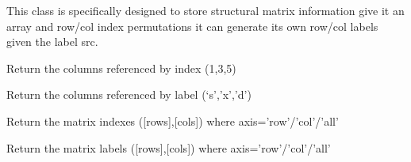 \documentclass[a4paper,11pt,english]{sphinxmanual}
\begin{document}

\begin{fulllineitems}
\label{modules_doc:cbmpy.CBDataStruct.StructMatrix}
This class is specifically designed to store structural matrix information
give it an array and row/col index permutations it can generate its own
row/col labels given the label src.

\begin{fulllineitems}
\label{modules_doc:cbmpy.CBDataStruct.StructMatrix.getColsByIdx}
Return the columns referenced by index (1,3,5)

\end{fulllineitems}


\begin{fulllineitems}
\label{modules_doc:cbmpy.CBDataStruct.StructMatrix.getColsByName}
Return the columns referenced by label (`s','x','d')

\end{fulllineitems}


\begin{fulllineitems}
\label{modules_doc:cbmpy.CBDataStruct.StructMatrix.getIndexes}
Return the matrix indexes ({[}rows{]},{[}cols{]}) where axis='row'/'col'/'all'

\end{fulllineitems}


\begin{fulllineitems}
\label{modules_doc:cbmpy.CBDataStruct.StructMatrix.getLabels}
Return the matrix labels ({[}rows{]},{[}cols{]}) where axis='row'/'col'/'all'

\end{fulllineitems}


\end{fulllineitems}
\end{document}
